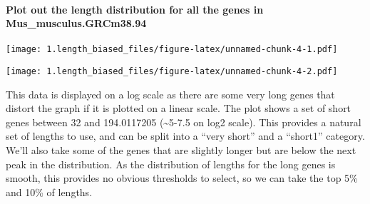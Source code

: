 \documentclass[]{article}
\newenvironment{Shaded}{\begin{snugshade}}{\end{snugshade}}
\newcommand{\KeywordTok}[1]{\textcolor[rgb]{0.13,0.29,0.53}{\textbf{#1}}}
\newcommand{\DataTypeTok}[1]{\textcolor[rgb]{0.13,0.29,0.53}{#1}}
\newcommand{\DecValTok}[1]{\textcolor[rgb]{0.00,0.00,0.81}{#1}}
\newcommand{\StringTok}[1]{\textcolor[rgb]{0.31,0.60,0.02}{#1}}
\newcommand{\OperatorTok}[1]{\textcolor[rgb]{0.81,0.36,0.00}{\textbf{#1}}}
\newcommand{\NormalTok}[1]{#1}
\let\oldparagraph\paragraph
\renewcommand{\paragraph}[1]{\oldparagraph{#1}\mbox{}}
\begin{document}
\paragraph{Plot out the length distribution for all the genes in
Mus\_musculus.GRCm38.94}\label{plot-out-the-length-distribution-for-all-the-genes-in-mus_musculus.grcm38.94}

\begin{Shaded}
\end{Shaded}

\texttt{[image: 1.length\_biased\_files/figure-latex/unnamed-chunk-4-1.pdf]}

\begin{Shaded}
\end{Shaded}

\texttt{[image: 1.length\_biased\_files/figure-latex/unnamed-chunk-4-2.pdf]}

This data is displayed on a log scale as there are some very long genes
that distort the graph if it is plotted on a linear scale. The plot
shows a set of short genes between 32 and 194.0117205
(\textasciitilde{}5-7.5 on log2 scale). This provides a natural set of
lengths to use, and can be split into a ``very short'' and a ``short1''
category. We'll also take some of the genes that are slightly longer but
are below the next peak in the distribution. As the distribution of
lengths for the long genes is smooth, this provides no obvious
thresholds to select, so we can take the top 5\% and 10\% of lengths.
\end{document}

